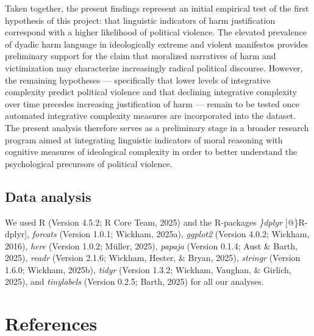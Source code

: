 \documentclass[
  english,
  man,floatsintext]{apa6}
\begin{document}
Taken together, the present findings represent an initial empirical test of the first hypothesis of this project: that linguistic indicators of harm justification correspond with a higher likelihood of political violence. The elevated prevalence of dyadic harm language in ideologically extreme and violent manifestos provides preliminary support for the claim that moralized narratives of harm and victimization may characterize increasingly radical political discourse. However, the remaining hypotheses --- specifically that lower levels of integrative complexity predict political violence and that declining integrative complexity over time precedes increasing justification of harm --- remain to be tested once automated integrative complexity measures are incorporated into the dataset. The present analysis therefore serves as a preliminary stage in a broader research program aimed at integrating linguistic indicators of moral reasoning with cognitive measures of ideological complexity in order to better understand the psychological precursors of political violence.

\subsection{Data analysis}\label{data-analysis}

We used R (Version 4.5.2; R Core Team, 2025) and the R-packages \emph{\}dplyr} {[}@\}R-dplyr{]}, \emph{forcats} (Version 1.0.1; Wickham, 2025a), \emph{ggplot2} (Version 4.0.2; Wickham, 2016), \emph{here} (Version 1.0.2; Müller, 2025), \emph{papaja} (Version 0.1.4; Aust \& Barth, 2025), \emph{readr} (Version 2.1.6; Wickham, Hester, \& Bryan, 2025), \emph{stringr} (Version 1.6.0; Wickham, 2025b), \emph{tidyr} (Version 1.3.2; Wickham, Vaughan, \& Girlich, 2025), and \emph{tinylabels} (Version 0.2.5; Barth, 2025) for all our analyses.

\newpage

\section{References}\label{references}
\end{document}

